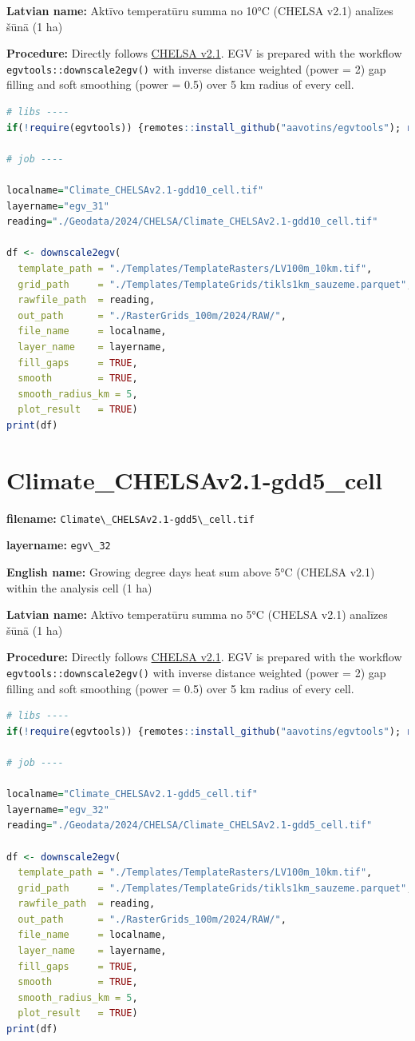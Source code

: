 \documentclass[
]{book}
\newcommand{\passthrough}[1]{#1}
\begin{document}
\textbf{Latvian name:} Aktīvo temperatūru summa no 10°C (CHELSA v2.1) analīzes šūnā (1 ha)

\textbf{Procedure:} Directly follows \hyperref[Ch04.11]{CHELSA v2.1}. EGV is prepared with the
workflow \passthrough{\lstinline!egvtools::downscale2egv()!} with inverse distance weighted (power = 2)
gap filling and soft smoothing (power = 0.5) over 5 km radius of every cell.

\begin{lstlisting}[language=R]
# libs ----
if(!require(egvtools)) {remotes::install_github("aavotins/egvtools"); require(egvtools)}

# job ----

localname="Climate_CHELSAv2.1-gdd10_cell.tif"
layername="egv_31"
reading="./Geodata/2024/CHELSA/Climate_CHELSAv2.1-gdd10_cell.tif"

df <- downscale2egv(
  template_path = "./Templates/TemplateRasters/LV100m_10km.tif",
  grid_path     = "./Templates/TemplateGrids/tikls1km_sauzeme.parquet",
  rawfile_path  = reading,
  out_path      = "./RasterGrids_100m/2024/RAW/",
  file_name     = localname,
  layer_name    = layername,
  fill_gaps     = TRUE,
  smooth        = TRUE,
  smooth_radius_km = 5,
  plot_result   = TRUE)
print(df)
\end{lstlisting}

\section{Climate\_CHELSAv2.1-gdd5\_cell}\label{ch06.032}

\textbf{filename:} \passthrough{\lstinline!Climate\_CHELSAv2.1-gdd5\_cell.tif!}

\textbf{layername:} \passthrough{\lstinline!egv\_32!}

\textbf{English name:} Growing degree days heat sum above 5°C (CHELSA v2.1) within the analysis cell (1 ha)

\textbf{Latvian name:} Aktīvo temperatūru summa no 5°C (CHELSA v2.1) analīzes šūnā (1 ha)

\textbf{Procedure:} Directly follows \hyperref[Ch04.11]{CHELSA v2.1}. EGV is prepared with the
workflow \passthrough{\lstinline!egvtools::downscale2egv()!} with inverse distance weighted (power = 2)
gap filling and soft smoothing (power = 0.5) over 5 km radius of every cell.

\begin{lstlisting}[language=R]
# libs ----
if(!require(egvtools)) {remotes::install_github("aavotins/egvtools"); require(egvtools)}

# job ----

localname="Climate_CHELSAv2.1-gdd5_cell.tif"
layername="egv_32"
reading="./Geodata/2024/CHELSA/Climate_CHELSAv2.1-gdd5_cell.tif"

df <- downscale2egv(
  template_path = "./Templates/TemplateRasters/LV100m_10km.tif",
  grid_path     = "./Templates/TemplateGrids/tikls1km_sauzeme.parquet",
  rawfile_path  = reading,
  out_path      = "./RasterGrids_100m/2024/RAW/",
  file_name     = localname,
  layer_name    = layername,
  fill_gaps     = TRUE,
  smooth        = TRUE,
  smooth_radius_km = 5,
  plot_result   = TRUE)
print(df)
\end{lstlisting}
\end{document}
